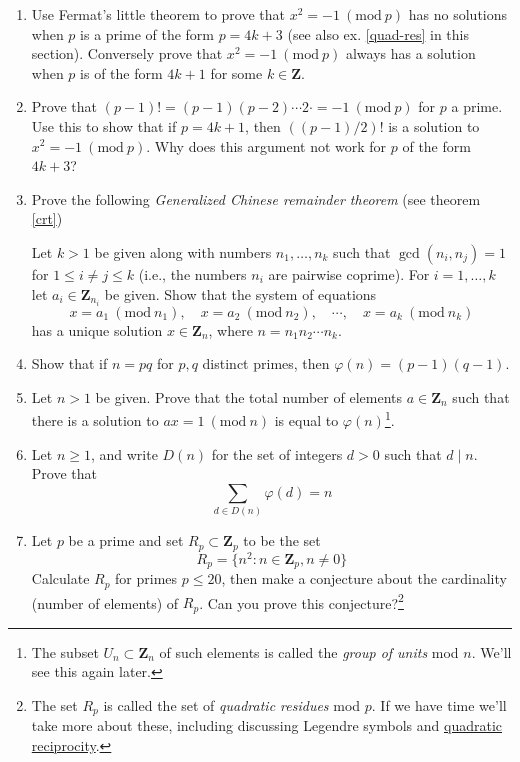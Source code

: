 \documentclass[12pt]{article}
\numberwithin{equation}{subsection}
\theoremstyle{note}
\newcommand{\Mod}[1]{\ (\mathrm{mod}\ #1)}
\begin{document}
\begin{enumerate}[label=\arabic*.]
	\item Use Fermat's little theorem  to prove that $x^2=-1\Mod{p}$ has no solutions when $p$ is a prime of the form $p=4k+3$ (see also ex. \ref{quad-res} in this section). Conversely prove that $x^2=-1\Mod{p}$ always has a solution when $p$ is of the form $4k+1$ for some $k\in\mathbf{Z}$.
	
	\item Prove that $(p-1)!=(p-1)(p-2)\cdots2\cdot =-1 \Mod{p}$ for $p$ a prime. Use this to show that if $p=4k+1$, then $((p-1)/2)!$ is a solution to $x^2=-1\Mod{p}$. Why does this argument not work for $p$ of the form $4k+3$?
	
	
	
	\item \label{gcrt} Prove the following \textit{Generalized Chinese remainder theorem} (see theorem \ref{crt}) 
	
	Let $k>1$ be given along with numbers $n_1,\dots,n_k$ such that $\gcd(n_i,n_j)=1$ for $1\leq i\neq j\leq k$ (i.e., the numbers $n_i$ are pairwise coprime). For $i=1,\dots,k$ let $a_i\in\mathbf{Z}_{n_i}$ be given. Show that the system of equations \[ x=a_1\Mod{n_1}, \quad x=a_2\Mod{n_2} ,\quad \cdots, \quad  x=a_k\Mod{n_k}\] has a unique solution $x\in\mathbf{Z}_{n}$, where $n=n_1n_2\cdots n_k$.  
	
	\item Show that if $n=pq$ for $p,q$ distinct primes, then $\varphi(n)=(p-1)(q-1)$. 
	
	\item Let $n>1$ be given. Prove that the total number of elements $a\in \mathbf{Z}_n$ such that there is a solution to $ax=1\Mod{n}$ is equal to $\varphi(n)$\footnote{The subset $U_n\subset \mathbf{Z}_n$ of such elements is called the \textit{group of units} mod $n$. We'll see this again later.}.
	\item Let $n\geq 1$, and write $D(n)$ for the set of integers $d>0$ such that $d\mid n$. Prove that \[ \sum_{d\in D(n)} \varphi(d)=n\]
	\item \label{quad-res} Let $p$ be a prime and set $R_p\subset\mathbf{Z}_p$ to be the set \[R_p=\{n^2 : n\in\mathbf{Z}_p, n\neq 0\}\] Calculate $R_p$ for primes $p\leq 20$, then make a conjecture about the cardinality (number of elements) of $R_p$. Can you prove this conjecture?\footnote{The set $R_p$ is called the set of \textit{quadratic residues} mod $p$. If we have time we'll take more about these, including discussing Legendre symbols and \href{https://en.wikipedia.org/wiki/Quadratic_reciprocity}{quadratic reciprocity}.}
	

\end{enumerate}
\end{document}
